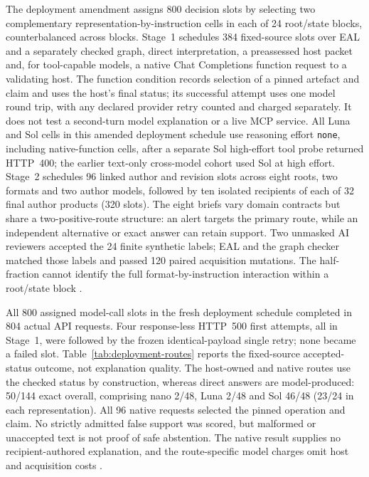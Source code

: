 \documentclass[preprint,12pt]{elsarticle}
\begin{document}
The deployment amendment assigns 800 decision slots by selecting two complementary representation-by-instruction cells in each of 24 root/state blocks, counterbalanced across blocks. Stage~1 schedules 384 fixed-source slots over EAL and a separately checked graph, direct interpretation, a preassessed host packet and, for tool-capable models, a native Chat Completions function request to a validating host. The function condition records selection of a pinned artefact and claim and uses the host's final status; its successful attempt uses one model round trip, with any declared provider retry counted and charged separately. It does not test a second-turn model explanation or a live MCP service. All Luna and Sol cells in this amended deployment schedule use reasoning effort \texttt{none}, including native-function cells, after a separate Sol high-effort tool probe returned HTTP~400; the earlier text-only cross-model cohort used Sol at high effort. Stage~2 schedules 96 linked author and revision slots across eight roots, two formats and two author models, followed by ten isolated recipients of each of 32 final author products (320 slots). The eight briefs vary domain contracts but share a two-positive-route structure: an alert targets the primary route, while an independent alternative or exact answer can retain support. Two unmasked AI reviewers accepted the 24 finite synthetic labels; EAL and the graph checker matched those labels and passed 120 paired acquisition mutations. The half-fraction cannot identify the full format-by-instruction interaction within a root/state block \citep{earlThreeStudyMethods}.

All 800 assigned model-call slots in the fresh deployment schedule completed in 804 actual API requests. Four response-less HTTP~500 first attempts, all in Stage~1, were followed by the frozen identical-payload single retry; none became a failed slot. Table~\ref{tab:deployment-routes} reports the fixed-source accepted-status outcome, not explanation quality. The host-owned and native routes use the checked status by construction, whereas direct answers are model-produced: 50/144 exact overall, comprising nano 2/48, Luna 2/48 and Sol 46/48 (23/24 in each representation). All 96 native requests selected the pinned operation and claim. No strictly admitted false support was scored, but malformed or unaccepted text is not proof of safe abstention. The native result supplies no recipient-authored explanation, and the route-specific model charges omit host and acquisition costs \citep{earlDeployment800}.
\end{document}
